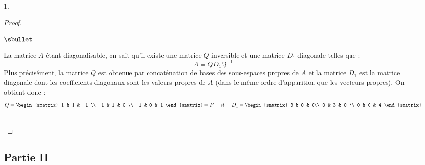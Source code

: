 \begin{noliste}{1.}
\begin{proof}
\begin{noliste}{$\sbullet$}
    \item La matrice $A$ étant diagonalisable, on sait qu'il existe
      une matrice $Q$ inversible et une matrice $D_1$ diagonale telles
      que :
      \[
      A = Q D_1 Q^{-1}
      \]
      Plus précisément, la matrice $Q$ est obtenue par concaténation
      de bases des sous-espaces propres de $A$ et la matrice $D_1$ est
      la matrice diagonale dont les coefficients diagonaux sont les
      valeurs propres de $A$ (dans le même ordre d'apparition que les
      vecteurs propres). On obtient donc : 
      \[
      Q =
      \begin{smatrix}
        1 & 1 & -1 \\
        -1 & 1 & 0 \\
        -1 & 0 & 1
      \end{smatrix}
      = P
      \quad \text{ et } \quad %
      D_1 = 
      \begin{smatrix}
        3 & 0 & 0\\
        0 & 3 & 0 \\
        0 & 0 & 4
      \end{smatrix}
      \]      
    \end{noliste}
    ~\\[-1cm]
  \end{proof}
\end{noliste}

\subsection*{Partie II} 

